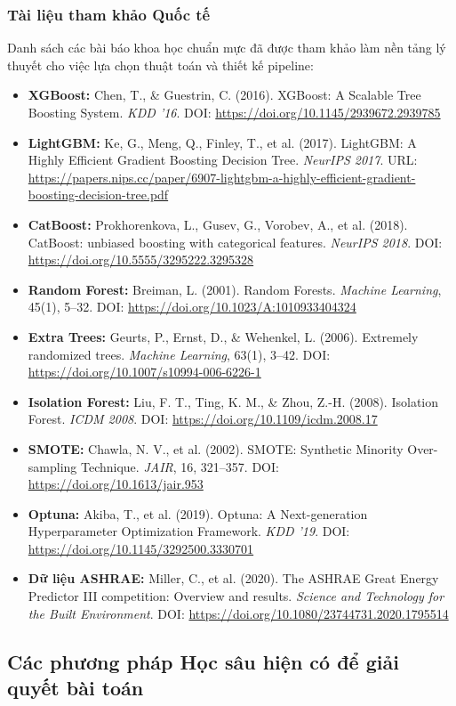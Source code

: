 \subsubsection{Tài liệu tham khảo Quốc tế}
Danh sách các bài báo khoa học chuẩn mực đã được tham khảo làm nền tảng lý thuyết cho việc lựa chọn thuật toán và thiết kế pipeline:
\begin{itemize}
    \item \textbf{XGBoost:} Chen, T., \& Guestrin, C. (2016). XGBoost: A Scalable Tree Boosting System. \textit{KDD '16}. DOI: \url{https://doi.org/10.1145/2939672.2939785}
    \item \textbf{LightGBM:} Ke, G., Meng, Q., Finley, T., et al. (2017). LightGBM: A Highly Efficient Gradient Boosting Decision Tree. \textit{NeurIPS 2017}. URL: \url{https://papers.nips.cc/paper/6907-lightgbm-a-highly-efficient-gradient-boosting-decision-tree.pdf}
    \item \textbf{CatBoost:} Prokhorenkova, L., Gusev, G., Vorobev, A., et al. (2018). CatBoost: unbiased boosting with categorical features. \textit{NeurIPS 2018}. DOI: \url{https://doi.org/10.5555/3295222.3295328}
    \item \textbf{Random Forest:} Breiman, L. (2001). Random Forests. \textit{Machine Learning}, 45(1), 5–32. DOI: \url{https://doi.org/10.1023/A:1010933404324}
    \item \textbf{Extra Trees:} Geurts, P., Ernst, D., \& Wehenkel, L. (2006). Extremely randomized trees. \textit{Machine Learning}, 63(1), 3–42. DOI: \url{https://doi.org/10.1007/s10994-006-6226-1}
    \item \textbf{Isolation Forest:} Liu, F. T., Ting, K. M., \& Zhou, Z.-H. (2008). Isolation Forest. \textit{ICDM 2008}. DOI: \url{https://doi.org/10.1109/icdm.2008.17}
    \item \textbf{SMOTE:} Chawla, N. V., et al. (2002). SMOTE: Synthetic Minority Over-sampling Technique. \textit{JAIR}, 16, 321–357. DOI: \url{https://doi.org/10.1613/jair.953}
    \item \textbf{Optuna:} Akiba, T., et al. (2019). Optuna: A Next-generation Hyperparameter Optimization Framework. \textit{KDD '19}. DOI: \url{https://doi.org/10.1145/3292500.3330701}
    \item \textbf{Dữ liệu ASHRAE:} Miller, C., et al. (2020). The ASHRAE Great Energy Predictor III competition: Overview and results. \textit{Science and Technology for the Built Environment}. DOI: \url{https://doi.org/10.1080/23744731.2020.1795514}
\end{itemize}

\subsection{Các phương pháp Học sâu hiện có để giải quyết bài toán}
